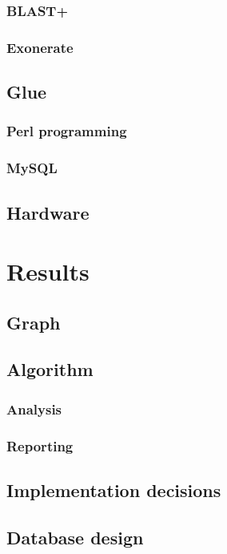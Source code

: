\documentclass[a4paper]{scrreprt}
\begin{document}
		\subsection{BLAST+}
			
		\subsection{Exonerate}
			
	\section{Glue}
		\subsection{Perl programming}
			
		\subsection{MySQL}
			
	\section{Hardware}
		

\chapter{Results}
	\section{Graph}
	\section{Algorithm}
		\subsection{Analysis}
			
		\subsection{Reporting}
			
	\section{Implementation decisions}
		
	\section{Database design}
		
\end{document}
